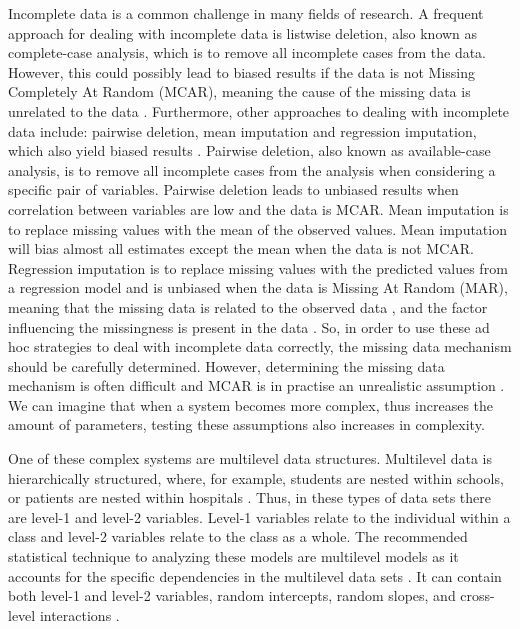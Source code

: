 \documentclass[10pt, a4paper, titlepage]{article}
\begin{document}
Incomplete data is a common challenge in many fields of research. A frequent approach for dealing with incomplete data is listwise deletion, also known as complete-case analysis, which is to remove all incomplete cases from the data. However, this could possibly lead to biased results if the data is not Missing Completely At Random (MCAR), meaning the cause of the missing data is unrelated to the data \citep{buurenFlexibleImputationMissing2018, kang2013, enders2017, austin2021, rubin1976}. Furthermore, other approaches to dealing with incomplete data include: pairwise deletion, mean imputation and regression imputation, which also yield biased results \citep{buurenFlexibleImputationMissing2018}. Pairwise deletion, also known as available-case analysis, is to remove all incomplete cases from the analysis when considering a specific pair of variables. Pairwise deletion leads to unbiased results when correlation between variables are low and the data is MCAR. Mean imputation is to replace missing values with the mean of the observed values. Mean imputation will bias almost all estimates except the mean when the data is not MCAR. Regression imputation is to replace missing values with the predicted values from a regression model and is unbiased when the data is Missing At Random (MAR), meaning that the missing data is related to the observed data \citep{rubin1976}, and the factor influencing the missingness is present in the data \citep{buurenFlexibleImputationMissing2018}. So, in order to use these ad hoc strategies to deal with incomplete data correctly, the missing data mechanism should be carefully determined. However, determining the missing data mechanism is often difficult and MCAR is in practise an unrealistic assumption \citep{buurenFlexibleImputationMissing2018}. We can imagine that when a system becomes more complex, thus increases the amount of parameters, testing these assumptions also increases in complexity.

One of these complex systems are multilevel data structures. Multilevel data is hierarchically structured, where, for example, students are nested within schools, or patients are nested within hospitals \citep{hox2017, hox2011}. Thus, in these types of data sets there are level-1 and level-2 variables. Level-1 variables relate to the individual within a class and level-2 variables relate to the class as a whole. The recommended statistical technique to analyzing these models are multilevel models as it accounts for the specific dependencies in the  multilevel data sets \citep{hox2017, hox2011, ludtke2017}. It can contain both level-1 and level-2 variables, random intercepts, random slopes, and cross-level interactions \citep{hox2017, hox2011}.
\end{document}
